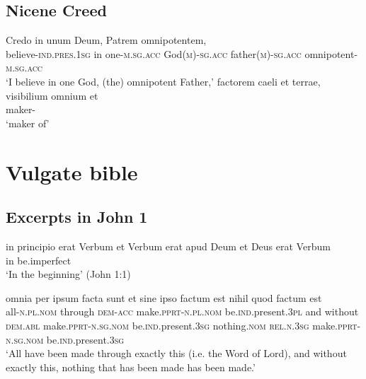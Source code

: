 \documentclass[a4paper, oneside]{report}
\newcommand*{\category}[1]{\textsc{#1}}
\newcommand{\translate}[1]{`#1'}
\begin{document}
\subsection{Nicene Creed}

\begin{exe}
    \ex \gll Credo in unum Deum, Patrem omnipotentem, \\
    believe-\category{ind}.\category{pres}.\category{1sg} in 
    one-\category{m}.\category{sg}.\category{acc} 
    God(\category{m})-\category{sg}.\category{acc} 
    father(\category{m})-\category{sg}.\category{acc}
    omnipotent-\category{m}.\category{sg}.\category{acc} \\
    \glt \translate{I believe in one God, (the) omnipotent Father,} 
    \ex \gll factorem caeli et terrae, visibilium omnium et \\ 
    maker- \\
    \glt \translate{maker of}
\end{exe}

\section{Vulgate bible}

\subsection{Excerpts in John 1}\label{sec:text.vulgate.john}

\begin{exe}
    \ex\label{ex:text.john.1.1} 
    \gll in principio erat Verbum et Verbum erat apud Deum et Deus erat Verbum \\
    in {} be.\acs{imperfect}  \\
    \glt \translate{In the beginning} (John 1:1)
    
    \ex\label{ex:text.john.1.3}
    \gll omnia per ipsum facta sunt 
    et sine ipso factum est nihil quod factum est \\
    all-\category{n}.\category{pl}.\category{nom} through \category{dem}-\category{acc}
    make.\category{pprt}-\category{n}.\category{pl}.\category{nom} 
    be.\category{ind}.\acs{present}.\category{3pl} 
    and without \category{dem}.\category{abl} 
    make.\category{pprt}-\category{n}.\category{sg}.\category{nom} 
    be.\category{ind}.\acs{present}.\category{3sg}
    nothing.\category{nom}
    \category{rel}.\category{n}.\category{3sg}
    make.\category{pprt}-\category{n}.\category{sg}.\category{nom} 
    be.\category{ind}.\acs{present}.\category{3sg} \\
    \glt \translate{All have been made through exactly this (i.e. the Word of Lord),
    and without exactly this, nothing that has been made has been made.}
\end{exe}
\end{document}
